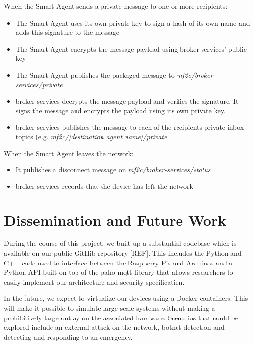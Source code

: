 \documentclass{article}
\begin{document}
When the Smart Agent sends a private message to one or more recipients:
\begin{itemize}
    \item The Smart Agent uses its own private key to sign a hash of its own name and adds this signature to the message
    \item The Smart Agent encrypts the message payload using broker-services' public key
    \item The Smart Agent publishes the packaged message to \textit{mf2c/broker-services/private}
    \item broker-services decrypts the message payload and verifies the signature. It signs the message and encrypts the payload using its own private key.
    \item broker-services publishes the message to each of the recipients private inbox topics (e.g. \textit{mf2c/[destination agent name]/private}
\end{itemize}


When the Smart Agent leaves the network:
\begin{itemize}
    \item It publishes a disconnect message on \textit{mf2c/broker-services/status}
    \item broker-services records that the device has left the network
\end{itemize}


\section{Dissemination and Future Work}

During the course of this project, we built up a substantial codebase which is available on our public GitHib repository [REF]. This includes the Python and C++ code used to interface between the Raspberry Pis and Arduinos and a Python API built on top of the paho-mqtt library that allows researchers to easily implement our architecture and security specification.

In the future, we expect to virtualize our devices using a Docker containers. This will make it possible to simulate large scale systems without making a prohibitively large outlay on the associated hardware. Scenarios that could be explored include an external attack on the network, botnet detection and detecting and responding to an emergency.
\end{document}
